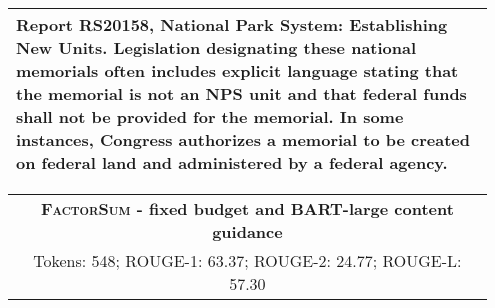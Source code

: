 \documentclass[11pt,table]{article}
\newcommand{\modelname}{FactorSum}
\begin{document}
\begin{table*}[ht]
\begin{tabular}{p{0.95\linewidth}}
Report RS20158, National Park System: Establishing New Units. Legislation designating these national memorials often includes explicit language stating that the memorial is not an NPS unit and that federal funds shall not be provided for the memorial. In some instances, Congress authorizes a memorial to be created on federal land and administered by a federal agency.\\
    \bottomrule
  \end{tabular}
  \caption{Summary generated by \textsc{\modelname} with BART content guidance for a document from GovReport test set (ID = 681). Reference summary is presented in Table \ref{tab:abstract_sample_govreport}.} \label{tab:summary_sample_govreport_lead_guidance}
\end{table*}


\begin{table*}[ht]
  \centering
  \begin{tabular}{p{0.95\linewidth}}
    \toprule
    \multicolumn{1}{c}{\textbf{\textsc{\modelname} - fixed budget and BART-large content guidance}} \\
    \multicolumn{1}{c}{Tokens: 548; ROUGE-1: 63.37; ROUGE-2: 24.77; ROUGE-L: 57.30} \\
    \midrule

\end{tabular}
\end{table*}
\end{document}
